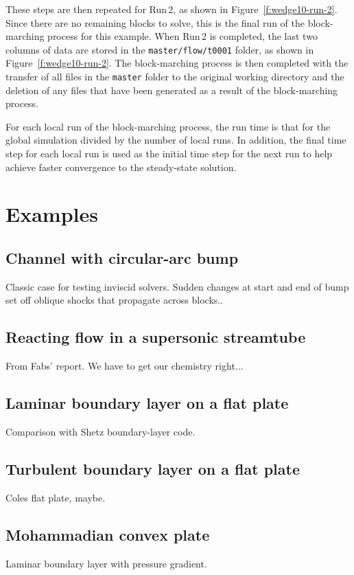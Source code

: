 \documentclass[12pt,a4paper,twoside]{article}
\begin{document}
\medskip
These steps are then repeated for Run\,2, as shown in Figure~\ref{f:wedge10-run-2}.
Since there are no remaining blocks to solve, this is the final run of the block-marching
process for this example. When Run\,2 is completed, the last two columns of data are 
stored in the \texttt{master/flow/t0001} folder, as shown 
in Figure~\ref{f:wedge10-run-2}. The block-marching process is then completed with the
transfer of all files in the \texttt{master} folder to the original working directory
and the deletion of any files that have been generated as a result of the block-marching
process.

\medskip
For each local run of the block-marching process, the run time is that for the global 
simulation divided by the number of local runs. In addition, the final time step for 
each local run is used as the initial time step for the next run to help achieve 
faster convergence to the steady-state solution.


\clearpage
\section{Examples}

\subsection{Channel with circular-arc bump}
%
Classic case for testing inviscid solvers.  
Sudden changes at start and end of bump set off oblique shocks that propagate across blocks..


\subsection{Reacting flow in a supersonic streamtube}
%
From Fabs' report.  
We have to get our chemistry right...


\subsection{Laminar boundary layer on a flat plate}
%
Comparison with Shetz boundary-layer code.


\subsection{Turbulent boundary layer on a flat plate}
%
Coles flat plate, maybe.


\subsection{Mohammadian convex plate}
%
Laminar boundary layer with pressure gradient.
\end{document}
